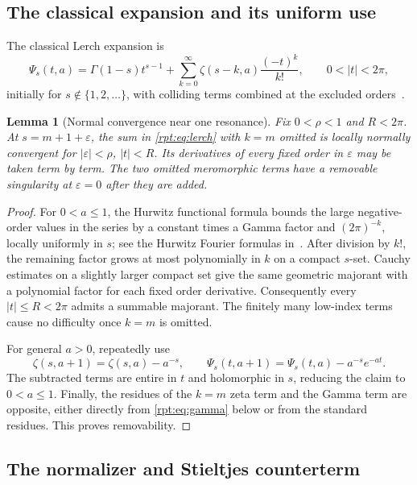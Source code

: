 \documentclass[11pt,a4paper]{article}
\numberwithin{equation}{section}
\newtheorem{lemma}[theorem]{Lemma}
\theoremstyle{definition}\newtheorem{definition}[theorem]{Definition}
\theoremstyle{remark}\newtheorem{remark}[theorem]{Remark}
\newcommand{\eps}{\varepsilon}
\begin{document}
\subsection{The classical expansion and its uniform use}

The classical Lerch expansion is
\begin{equation}
\Psi_s(t,a)=\Gamma(1-s)t^{s-1}
 +\sum_{k=0}^{\infty}\zeta(s-k,a)\frac{(-t)^k}{k!},
\qquad 0<|t|<2\pi,
\label{rpt:eq:lerch}
\end{equation}
initially for $s\notin\{1,2,\ldots\}$, with colliding terms combined at the excluded orders~\cite{dlmflerch,erdelyi}.

\begin{lemma}[Normal convergence near one resonance]
\label{rpt:lem:normal}
Fix $0<\rho<1$ and $R<2\pi$. At $s=m+1+\eps$, the sum in \eqref{rpt:eq:lerch} with $k=m$ omitted is locally normally convergent for $|\eps|<\rho$, $|t|<R$. Its derivatives of every fixed order in $\eps$ may be taken term by term. The two omitted meromorphic terms have a removable singularity at $\eps=0$ after they are added.
\end{lemma}
\begin{proof}
For $0<a\le1$, the Hurwitz functional formula bounds the large negative-order values in the series by a constant times a Gamma factor and $(2\pi)^{-k}$, locally uniformly in $s$; see the Hurwitz Fourier formulas in~\cite{dlmfhurwitz}. After division by $k!$, the remaining factor grows at most polynomially in $k$ on a compact $s$-set. Cauchy estimates on a slightly larger compact set give the same geometric majorant with a polynomial factor for each fixed order derivative. Consequently every $|t|\le R<2\pi$ admits a summable majorant. The finitely many low-index terms cause no difficulty once $k=m$ is omitted.

For general $a>0$, repeatedly use
\[
\zeta(s,a+1)=\zeta(s,a)-a^{-s},\qquad
\Psi_s(t,a+1)=\Psi_s(t,a)-a^{-s}e^{-at}.
\]
The subtracted terms are entire in $t$ and holomorphic in $s$, reducing the claim to $0<a\le1$. Finally, the residues of the $k=m$ zeta term and the Gamma term are opposite, either directly from \eqref{rpt:eq:gamma} below or from the standard residues. This proves removability.
\end{proof}

\subsection{The normalizer and Stieltjes counterterm}
\end{document}
